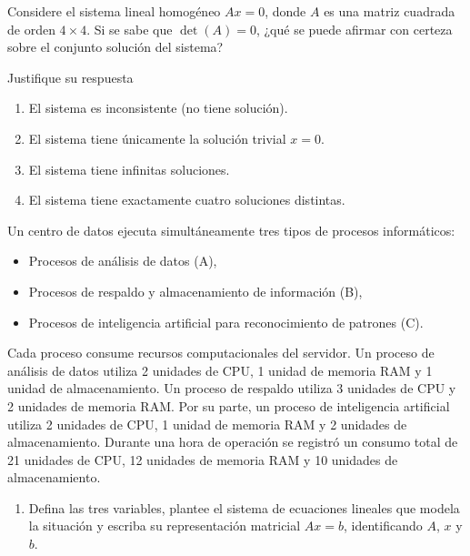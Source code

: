 \documentclass[10pt,a4]{examenEPN0}
\begin{document}
\encabezado
{}
\indicacionesPrueba
\begin{preguntas}


\item  Considere el sistema lineal homogéneo $Ax = 0$, donde $A$ es una matriz cuadrada de orden $4 \times 4$. Si se sabe que $\det(A) = 0$, ¿qué se puede afirmar con certeza sobre el conjunto solución del sistema?

Justifique su respuesta 
    \begin{enumerate}[label=(\alph*), itemsep=2pt]
        \item El sistema es inconsistente (no tiene solución).
        \item El sistema tiene únicamente la solución trivial $x = 0$.
        \item El sistema tiene infinitas soluciones.
        \item El sistema tiene exactamente cuatro soluciones distintas.
    \end{enumerate}   
    \newpage

\item Un centro de datos ejecuta simultáneamente tres tipos de
procesos informáticos:

\begin{itemize}
\item Procesos de análisis de datos (A),
\item Procesos de respaldo y almacenamiento de información (B),
\item Procesos de inteligencia artificial para reconocimiento de patrones (C).
\end{itemize}
Cada proceso consume recursos computacionales del servidor.
Un proceso de análisis de datos utiliza 2 unidades de CPU,
1 unidad de memoria RAM y 1 unidad de almacenamiento.
Un proceso de respaldo utiliza 3 unidades de CPU y 2 unidades
de memoria RAM. Por su parte, un proceso de inteligencia
artificial utiliza 2 unidades de CPU, 1 unidad de memoria RAM
y 2 unidades de almacenamiento. Durante una hora de operación se registró un consumo total de 21 unidades de CPU, 12 unidades de memoria RAM y
10 unidades de almacenamiento.

\begin{enumerate}
\item Defina las tres variables, plantee el sistema de ecuaciones
lineales que modela la situación y escriba su representación
matricial $Ax=b$, identificando $A$, $x$ y $b$. 


\end{enumerate}
\end{preguntas}
\end{document}
